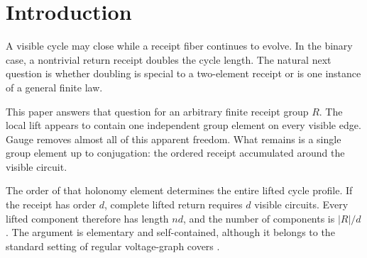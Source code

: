 \section{Introduction}

A visible cycle may close while a receipt fiber continues to evolve. In the
binary case, a nontrivial return receipt doubles the cycle length. The natural
next question is whether doubling is special to a two-element receipt or is
one instance of a general finite law.

This paper answers that question for an arbitrary finite receipt group $R$.
The local lift appears to contain one independent group element on every
visible edge. Gauge removes almost all of this apparent freedom. What remains
is a single group element up to conjugation: the ordered receipt accumulated
around the visible circuit.

The order of that holonomy element determines the entire lifted cycle profile.
If the receipt has order $d$, complete lifted return requires $d$ visible
circuits. Every lifted component therefore has length $nd$, and the number of
components is $|R|/d$. The argument is elementary and self-contained, although
it belongs to the standard setting of regular voltage-graph covers
\cite{gross-tucker}.

